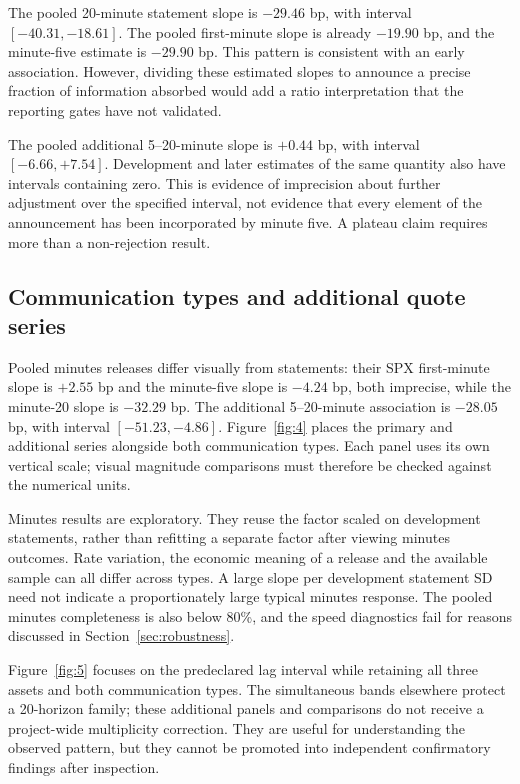 
The pooled 20-minute statement slope is $-29.46$ bp, with interval $[-40.31,-18.61]$. The pooled first-minute slope is already $-19.90$ bp, and the minute-five estimate is $-29.90$ bp. This pattern is consistent with an early association. However, dividing these estimated slopes to announce a precise fraction of information absorbed would add a ratio interpretation that the reporting gates have not validated.

The pooled additional 5--20-minute slope is $+0.44$ bp, with interval $[-6.66,+7.54]$. Development and later estimates of the same quantity also have intervals containing zero. This is evidence of imprecision about further adjustment over the specified interval, not evidence that every element of the announcement has been incorporated by minute five. A plateau claim requires more than a non-rejection result.

\subsection{Communication types and additional quote series}
Pooled minutes releases differ visually from statements: their SPX first-minute slope is $+2.55$ bp and the minute-five slope is $-4.24$ bp, both imprecise, while the minute-20 slope is $-32.29$ bp. The additional 5--20-minute association is $-28.05$ bp, with interval $[-51.23,-4.86]$. Figure~\ref{fig:4} places the primary and additional series alongside both communication types. Each panel uses its own vertical scale; visual magnitude comparisons must therefore be checked against the numerical units.


Minutes results are exploratory. They reuse the factor scaled on development statements, rather than refitting a separate factor after viewing minutes outcomes. Rate variation, the economic meaning of a release and the available sample can all differ across types. A large slope per development statement SD need not indicate a proportionately large typical minutes response. The pooled minutes completeness is also below 80\%, and the speed diagnostics fail for reasons discussed in Section~\ref{sec:robustness}.


Figure~\ref{fig:5} focuses on the predeclared lag interval while retaining all three assets and both communication types. The simultaneous bands elsewhere protect a 20-horizon family; these additional panels and comparisons do not receive a project-wide multiplicity correction. They are useful for understanding the observed pattern, but they cannot be promoted into independent confirmatory findings after inspection.

